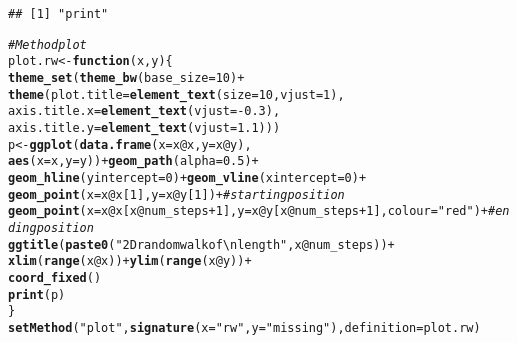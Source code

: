 \documentclass{article}\usepackage[]{graphicx}\usepackage[]{color}
\makeatletter
\newcommand{\hlnum}[1]{\textcolor[rgb]{0.686,0.059,0.569}{#1}}%
\newcommand{\hlstr}[1]{\textcolor[rgb]{0.192,0.494,0.8}{#1}}%
\newcommand{\hlcom}[1]{\textcolor[rgb]{0.678,0.584,0.686}{\textit{#1}}}%
\newcommand{\hlopt}[1]{\textcolor[rgb]{0,0,0}{#1}}%
\newcommand{\hlstd}[1]{\textcolor[rgb]{0.345,0.345,0.345}{#1}}%
\newcommand{\hlkwa}[1]{\textcolor[rgb]{0.161,0.373,0.58}{\textbf{#1}}}%
\newcommand{\hlkwb}[1]{\textcolor[rgb]{0.69,0.353,0.396}{#1}}%
\newcommand{\hlkwc}[1]{\textcolor[rgb]{0.333,0.667,0.333}{#1}}%
\newcommand{\hlkwd}[1]{\textcolor[rgb]{0.737,0.353,0.396}{\textbf{#1}}}%
\newenvironment{kframe}{%
 \def\at@end@of@kframe{}%
 \ifinner\ifhmode%
  \def\at@end@of@kframe{\end{minipage}}%
  \begin{minipage}{\columnwidth}%
 \fi\fi%
 \def\FrameCommand##1{\hskip\@totalleftmargin \hskip-\fboxsep
 \colorbox{shadecolor}{##1}\hskip-\fboxsep
     \hskip-\linewidth \hskip-\@totalleftmargin \hskip\columnwidth}%
 \MakeFramed {\advance\hsize-\width
   \@totalleftmargin\z@ \linewidth\hsize
   \@setminipage}}%
 {\par\unskip\endMakeFramed%
 \at@end@of@kframe}
\newenvironment{knitrout}{}{} %
\makeatother
\begin{document}
\begin{knitrout}
\begin{kframe}
{\ttfamily\noindent\itshape\color{messagecolor}{\#\# Creating a generic function for 'print' from package 'base' in the global environment}}\begin{verbatim}
## [1] "print"
\end{verbatim}
\begin{alltt}
 \hlcom{# Method plot}
\hlstd{plot.rw} \hlkwb{<-} \hlkwa{function}\hlstd{(}\hlkwc{x}\hlstd{,} \hlkwc{y}\hlstd{) \{}
  \hlkwd{theme_set}\hlstd{(}\hlkwd{theme_bw}\hlstd{(}\hlkwc{base_size} \hlstd{=} \hlnum{10}\hlstd{)} \hlopt{+}
              \hlkwd{theme}\hlstd{(}\hlkwc{plot.title} \hlstd{=} \hlkwd{element_text}\hlstd{(}\hlkwc{size} \hlstd{=} \hlnum{10}\hlstd{,} \hlkwc{vjust} \hlstd{=} \hlnum{1}\hlstd{),}
                    \hlkwc{axis.title.x} \hlstd{=} \hlkwd{element_text}\hlstd{(}\hlkwc{vjust} \hlstd{=} \hlopt{-}\hlnum{0.3}\hlstd{),}
                    \hlkwc{axis.title.y} \hlstd{=} \hlkwd{element_text}\hlstd{(}\hlkwc{vjust} \hlstd{=} \hlnum{1.1}\hlstd{)))}
  \hlstd{p} \hlkwb{<-} \hlkwd{ggplot}\hlstd{(}\hlkwd{data.frame}\hlstd{(}\hlkwc{x} \hlstd{= x}\hlopt{@}\hlkwc{x}\hlstd{,} \hlkwc{y} \hlstd{= x}\hlopt{@}\hlkwc{y}\hlstd{),}
              \hlkwd{aes}\hlstd{(}\hlkwc{x} \hlstd{= x,} \hlkwc{y} \hlstd{= y))} \hlopt{+} \hlkwd{geom_path}\hlstd{(}\hlkwc{alpha} \hlstd{=} \hlnum{0.5}\hlstd{)} \hlopt{+}
    \hlkwd{geom_hline}\hlstd{(}\hlkwc{yintercept} \hlstd{=} \hlnum{0}\hlstd{)} \hlopt{+} \hlkwd{geom_vline}\hlstd{(}\hlkwc{xintercept} \hlstd{=} \hlnum{0}\hlstd{)} \hlopt{+}
    \hlkwd{geom_point}\hlstd{(}\hlkwc{x} \hlstd{= x}\hlopt{@}\hlkwc{x}\hlstd{[}\hlnum{1}\hlstd{],} \hlkwc{y} \hlstd{= x}\hlopt{@}\hlkwc{y}\hlstd{[}\hlnum{1}\hlstd{])} \hlopt{+} \hlcom{# starting position}
    \hlkwd{geom_point}\hlstd{(}\hlkwc{x} \hlstd{= x}\hlopt{@}\hlkwc{x}\hlstd{[x}\hlopt{@}\hlkwc{num_steps}\hlopt{+}\hlnum{1}\hlstd{],} \hlkwc{y} \hlstd{= x}\hlopt{@}\hlkwc{y}\hlstd{[x}\hlopt{@}\hlkwc{num_steps}\hlopt{+}\hlnum{1}\hlstd{],} \hlkwc{colour} \hlstd{=} \hlstr{"red"}\hlstd{)} \hlopt{+} \hlcom{# ending position}
    \hlkwd{ggtitle}\hlstd{(}\hlkwd{paste0}\hlstd{(}\hlstr{"2D random walk of \textbackslash{}nlength "}\hlstd{, x}\hlopt{@}\hlkwc{num_steps}\hlstd{))} \hlopt{+}
    \hlkwd{xlim}\hlstd{(}\hlkwd{range}\hlstd{(x}\hlopt{@}\hlkwc{x}\hlstd{))} \hlopt{+} \hlkwd{ylim}\hlstd{(}\hlkwd{range}\hlstd{(x}\hlopt{@}\hlkwc{y}\hlstd{))} \hlopt{+}
    \hlkwd{coord_fixed}\hlstd{()}
  \hlkwd{print}\hlstd{(p)}
\hlstd{\}}
\hlkwd{setMethod}\hlstd{(}\hlstr{"plot"}\hlstd{,} \hlkwd{signature}\hlstd{(}\hlkwc{x} \hlstd{=} \hlstr{"rw"}\hlstd{,} \hlkwc{y} \hlstd{=} \hlstr{"missing"}\hlstd{),} \hlkwc{definition} \hlstd{= plot.rw)}
\end{alltt}



\end{kframe}
\end{knitrout}
\end{document}
